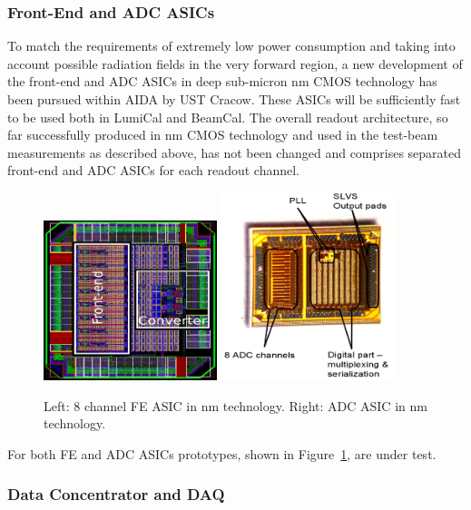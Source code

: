 \subsubsection{Front-End and ADC ASICs}


To match the requirements of extremely low power consumption and taking into account possible radiation
fields in the very forward region, a new development of the front-end and ADC ASICs in deep sub-micron
\unit[130]{nm} CMOS technology has been
pursued within AIDA by UST Cracow.
These ASICs will be sufficiently fast to be used both in LumiCal and BeamCal.
The overall readout architecture, so far successfully produced in \unit[350]{nm} CMOS technology and used in the test-beam
measurements as described above, has not been changed and comprises separated front-end
and ADC ASICs for each readout channel.
\begin{figure}[hbp]
\centering
    \includegraphics[width=0.45\textwidth]{Calorimeter/FCAL/figs/FE_ASIC.png} \hfill
	\includegraphics[width=0.45\textwidth]{Calorimeter/FCAL/figs/ADC_ASIC_2.png}
	\caption{Left: 8 channel FE ASIC in \unit[130]{nm} technology.
		 	 Right: ADC ASIC in \unit[130]{nm} technology.}
    \label{fig:ASIC_ADC}
\end{figure}
For both FE and ADC ASICs prototypes, shown in Figure~\ref{fig:ASIC_ADC}, are under test.

\subsubsection{Data Concentrator and DAQ}

